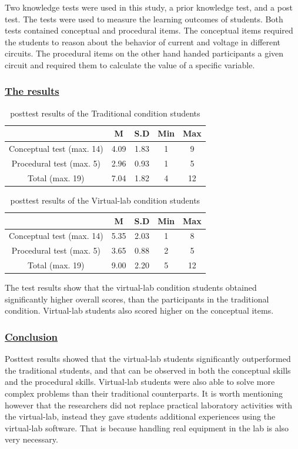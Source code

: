 \documentclass[../main.tex]{subfiles}
\begin{document}
Two knowledge tests were used in this study, a prior knowledge test, and a post test. The tests were used to measure the learning outcomes of students. Both tests contained conceptual and procedural items. The conceptual items required the students to reason about the behavior of current and voltage in different circuits. The procedural items on the other hand handed participants a given circuit and required them to calculate the value of a specific variable.

\newpage
\subsubsection*{\underline{The results}}
\begin{table}[!ht]
    \caption{posttest results of the Traditional condition students}  
    \centering
    \begin{tabular}{|c|c|c|c|c|}
       \hline
         & M & S.D & Min & Max \\
       \hline
       Conceptual test (max. 14) & 4.09 & 1.83 & 1 & 9 \\
      \hline
       Procedural test (max. 5) & 2.96 & 0.93 & 1 & 5 \\
       \hline
       Total (max. 19) & 7.04 & 1.82 & 4 & 12 \\
       \hline
       \end{tabular}
    \label{tab:3}
\end{table}
\begin{table}[!ht]
    \caption{posttest results of the Virtual-lab condition students}  
    \centering
    \begin{tabular}{|c|c|c|c|c|}
       \hline
         & M & S.D & Min & Max \\
       \hline
       Conceptual test (max. 14) & 5.35 & 2.03 & 1 & 8 \\
      \hline
       Procedural test (max. 5) & 3.65 & 0.88 & 2 & 5 \\
       \hline
       Total (max. 19) & 9.00 & 2.20 & 5 & 12 \\
       \hline
       \end{tabular}
    \label{tab:4}
\end{table}

The test results show that the virtual-lab condition students obtained significantly higher overall scores, than the participants in the traditional condition. Virtual-lab students also scored higher on the conceptual items.

\subsubsection*{\underline{Conclusion}}
Posttest results showed that the virtual-lab students significantly outperformed the traditional students, and that can be observed in both the conceptual skills and the procedural skills. Virtual-lab students were also able to solve more complex problems than their traditional counterparts. It is worth mentioning however that the researchers did not replace practical laboratory activities with the virtual-lab, instead they gave students additional experiences using the virtual-lab software. That is because handling real equipment in the lab is also very necessary.
\end{document}
